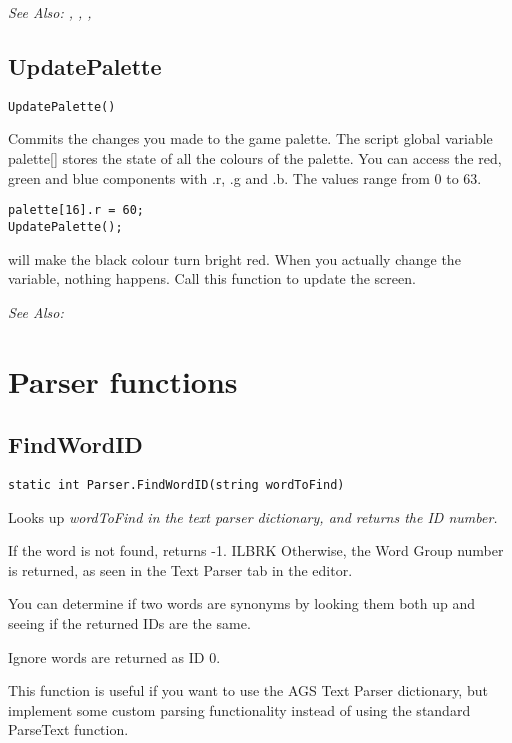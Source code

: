 \it{See Also:} , , , 

\subsection{UpdatePalette}\label{UpdatePalette}%

\begin{verbatim}
UpdatePalette()
\end{verbatim}
Commits the changes you made to the game palette.
The script global variable  palette[]  stores the state of all the
colours of the palette. You can access the red, green and blue components
with .r, .g and .b. The values range from 0 to 63.

\begin{verbatim}
palette[16].r = 60;
UpdatePalette();
\end{verbatim}
will make the black colour turn bright red. When you actually change the variable, nothing happens. Call this function to update the screen.

\it{See Also:} 


\section{Parser functions}%


\subsection{FindWordID}\label{Parser.FindWordID}%

\begin{verbatim}
static int Parser.FindWordID(string wordToFind)
\end{verbatim}
Looks up \it{wordToFind} in the text parser dictionary, and returns the ID number.

If the word is not found, returns -1. ILBRK
Otherwise, the Word Group number is returned, as seen in the Text Parser tab in the editor.

You can determine if two words are synonyms by looking them both up and seeing if the
returned IDs are the same.

Ignore words are returned as ID 0.

This function is useful if you want to use the AGS Text Parser dictionary, but implement
some custom parsing functionality instead of using the standard ParseText function.

